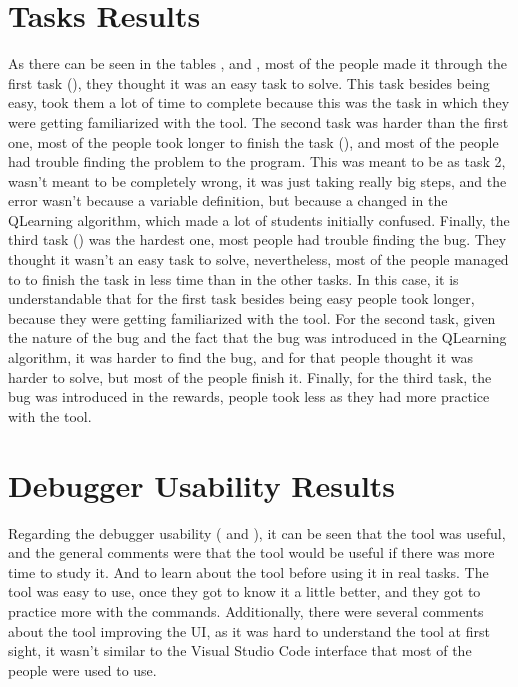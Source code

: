 \section{Tasks Results}
\label{sec:tasks-results}
As there can be seen in the tables ,  and 
, most of the people made it through the first task (),
they thought it was an easy task to solve. This task besides being easy, took them a lot of 
time to complete because this was the task in which they were getting familiarized with the 
tool. The second task was harder than the first one, most of the people took longer to finish the 
task (), and most of the people had trouble finding the problem to the program. 
This was meant to be as task 2, wasn't meant to be completely wrong, it was just taking really big 
steps, and the error wasn't because a variable definition, but because a changed in the QLearning
algorithm, which made a lot of students initially confused. Finally, the third task () was the hardest 
one, most people had trouble finding the bug. They thought it wasn't an easy task to solve, 
nevertheless, most of the people managed to to finish the task in less time than in the other tasks. 
In this case, it is understandable that for the first task besides being 
easy people took longer, because they were getting familiarized with the tool. For the second task,
given the nature of the bug and the fact that the bug was introduced in the QLearning algorithm, 
it was harder to find the bug, and for that people thought it was harder to solve, but
most of the people finish it. Finally, for the third task, the bug was introduced in the rewards,
people took less as they had more practice with the tool.



\section{Debugger Usability Results}
\label{sec:usability}

Regarding the debugger usability ( and ), it can 
be seen that the tool was useful,
and the general comments were that the tool would be useful if there was more time to study it. 
And to learn about the tool before using it in real tasks. The 
tool was easy to use, once they got to know it a little better, and they got to practice more with the commands.
Additionally, there were several comments about the tool improving the UI,
as it was hard to understand the tool at first sight, it wasn't similar to the Visual Studio Code 
interface that most of the people were used to use.

